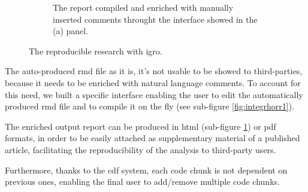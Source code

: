 \begin{figure}
\begin{subfigure}{.5\textwidth}
  \caption{The report compiled and enriched with manually inserted comments throught the interface showed in the (a) panel.}
  \label{fig:integrhorr2}
\end{subfigure}
\caption[IntegrHO report editing]{The reproducible research with \gls{igro}.}
\label{fig:integrhorr}
\end{figure}

The auto-produced \gls{rmd} file as it is, it's not usable to be showed to third-parties, because it needs to be enriched with natural language comments.
To account for this need, we built a specific interface enabling the user to edit the automatically produced \gls{rmd} file and to compile it on the fly (see sub-figure \ref{fig:integrhorr1}).

The enriched output report can be produced in \gls{html} (sub-figure \ref{fig:integrhorr2}) or \gls{pdf} formats, in order to be easily attached as supplementary material of a published article, facilitating the reproducibility of the analysis to third-party users.

Furthermore, thanks to the \gls{cdf} system, each code chunk is not dependent on previous ones, enabling the final user to add/remove multiple code chunks.